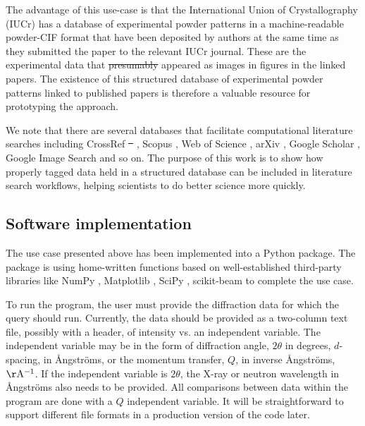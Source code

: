 \documentclass[preprint]{iucr}
\providecommand{\DIFadd}[1]{{\protect\color{blue}\uwave{#1}}} %
\providecommand{\DIFdel}[1]{{\protect\color{red}\sout{#1}}}                      %
\providecommand{\DIFaddbegin}{} %
\providecommand{\DIFaddend}{} %
\providecommand{\DIFdelbegin}{} %
\providecommand{\DIFdelend}{} %
\newcommand{\DIFscaledelfig}{0.5}
\newlength{\DIFdelgraphicswidth} %
\newlength{\DIFdelgraphicsheight} %
\newcommand{\DIFaddincludegraphics}[2][]{{\color{blue}\fbox{\DIFOincludegraphics[#1]{#2}}}} %
\newcommand{\DIFdelincludegraphics}[2][]{%
\sbox{\DIFdelgraphicsbox}{\DIFOincludegraphics[#1]{#2}}%
\settoboxwidth{\DIFdelgraphicswidth}{\DIFdelgraphicsbox} %
\settoboxtotalheight{\DIFdelgraphicsheight}{\DIFdelgraphicsbox} %
\scalebox{\DIFscaledelfig}{%
\parbox[b]{\DIFdelgraphicswidth}{\usebox{\DIFdelgraphicsbox}\\[-\baselineskip] \rule{\DIFdelgraphicswidth}{0em}}\llap{\resizebox{\DIFdelgraphicswidth}{\DIFdelgraphicsheight}{%
\setlength{\unitlength}{\DIFdelgraphicswidth}%
\begin{picture}(1,1)%
\thicklines\linethickness{2pt} %
{\color[rgb]{1,0,0}\put(0,0){\framebox(1,1){}}}%
{\color[rgb]{1,0,0}\put(0,0){\line( 1,1){1}}}%
{\color[rgb]{1,0,0}\put(0,1){\line(1,-1){1}}}%
\end{picture}%
}\hspace*{3pt}}} %
} %
\DeclareRobustCommand{\DIFaddbegin}{\DIFOaddbegin \let\includegraphics\DIFaddincludegraphics} %
\DeclareRobustCommand{\DIFaddend}{\DIFOaddend \let\includegraphics\DIFOincludegraphics} %
\DeclareRobustCommand{\DIFdelbegin}{\DIFOdelbegin \let\includegraphics\DIFdelincludegraphics} %
\DeclareRobustCommand{\DIFdelend}{\DIFOaddend \let\includegraphics\DIFOincludegraphics} %
\begin{document}
The advantage of this use-case is that the International Union of Crystallography (IUCr) has a database of experimental powder patterns in a machine-readable powder-CIF format \cite{hallInternationalTablesCrystallography2006} that have been deposited by authors at the same time as they submitted the paper to the relevant IUCr journal.   These are the experimental data that \DIFdelbegin \DIFdel{presumably }\DIFdelend \DIFaddbegin \DIFadd{generally }\DIFaddend appeared as images in figures in the linked papers.  The existence of this structured database of experimental powder patterns linked to published papers is therefore a valuable resource for prototyping the approach. 

We note that there are several databases that facilitate computational literature searches including CrossRef \DIFdelbegin \DIFdel{\mbox{%
\cite{crossrefCrossrefRESTAPI2022}}\hspace{0pt}%
}\DIFdelend \DIFaddbegin \DIFadd{\mbox{%
\cite{crossrefRESTAPI2020}}\hspace{0pt}%
}\DIFaddend , Scopus \cite{mongeonJournalCoverageWeb2016,burnhamScopusDatabaseReview2006}, Web of Science \cite{mongeonJournalCoverageWeb2016,mikkiGoogleScholarCompared2009}, arXiv \cite{ginspargArXiv202011}, Google Scholar \cite{mikkiGoogleScholarCompared2009, samadzadehComparisonFourSearch2013}, Google Image Search \cite{fergusLearningObjectCategories2005} and so on.  The purpose of this work is to show how properly tagged data held in a structured database can be included in literature search workflows, helping scientists to do better science more quickly.


\subsection{Software implementation}

The use case presented above has been implemented into a Python package. The package is using home-written functions based on well-established third-party libraries like NumPy \cite{harrisArrayProgrammingNumPy2020}, Matplotlib \cite{hunterMatplotlib2DGraphics2007a}, SciPy \cite{virtanenSciPyFundamentalAlgorithms2020b}, scikit-beam \cite{scikit-beamScikitbeam2022} to complete the use case.

To run the program, the user must provide the diffraction data for which the query should run. Currently, the data should be provided as a two-column  text file, possibly with a header, of intensity vs. an independent variable. The independent variable may be in the form of diffraction angle, $2\theta$ in degrees, $d$-spacing, in Ångströms, or the momentum transfer, $Q$, in inverse Ångströms, $\mathrm{\AA^{-1}}$. If the independent variable is $2\theta$,  the X-ray or neutron wavelength in Ångströms also needs to be provided.  All comparisons between data within the program are done with a $Q$ independent variable.  It will be straightforward to support different file formats in a production version of the code later.
\end{document}

